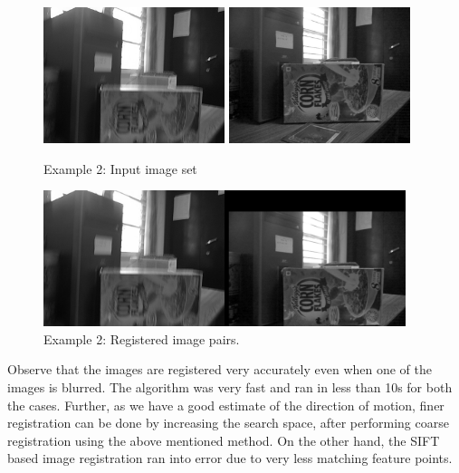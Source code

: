 \documentclass[BTech]{iitmdiss}
\begin{document}
\begin{figure}[H]
\begin{center}
\includegraphics[width=150pt]{images/imreg/shift/eg2/saved_im.png}
\includegraphics[width=150pt]{images/imreg/shift/eg2/preview_im.png}
\caption{Example 2: Input image set}
\includegraphics[width=300pt]{images/imreg/shift/eg2/imreg.png}
\caption{Example 2: Registered image pairs.}
\label{fig:shift_reg}
\end{center}
\end{figure}

Observe that the images are registered very accurately even when one of
the images is blurred. The algorithm was very fast and ran in less than
10s for both the cases. Further, as we have a good estimate of the 
direction of motion, finer registration can be done by increasing the
search space, after performing coarse registration using the above mentioned
method. On the other hand, the SIFT based image registration ran into error
due to very less matching feature points.
\end{document}
